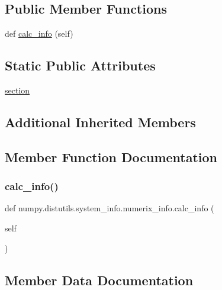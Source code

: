 \subsection*{Public Member Functions}
\begin{DoxyCompactItemize}
\item 
def \hyperlink{classnumpy_1_1distutils_1_1system__info_1_1numerix__info_ac8d62fb30470caae1c96f381edcf3bdf}{calc\+\_\+info} (self)
\end{DoxyCompactItemize}
\subsection*{Static Public Attributes}
\begin{DoxyCompactItemize}
\item 
\hyperlink{classnumpy_1_1distutils_1_1system__info_1_1numerix__info_a34232da6147931e7654cbf2d8a259d92}{section}
\end{DoxyCompactItemize}
\subsection*{Additional Inherited Members}


\subsection{Member Function Documentation}
\mbox{\label{classnumpy_1_1distutils_1_1system__info_1_1numerix__info_ac8d62fb30470caae1c96f381edcf3bdf}} 
\subsubsection{\texorpdfstring{calc\+\_\+info()}{calc\_info()}}
{\footnotesize\ttfamily def numpy.\+distutils.\+system\+\_\+info.\+numerix\+\_\+info.\+calc\+\_\+info (\begin{DoxyParamCaption}\item[{}]{self }\end{DoxyParamCaption})}



\subsection{Member Data Documentation}
\mbox{\label{classnumpy_1_1distutils_1_1system__info_1_1numerix__info_a34232da6147931e7654cbf2d8a259d92}} 
